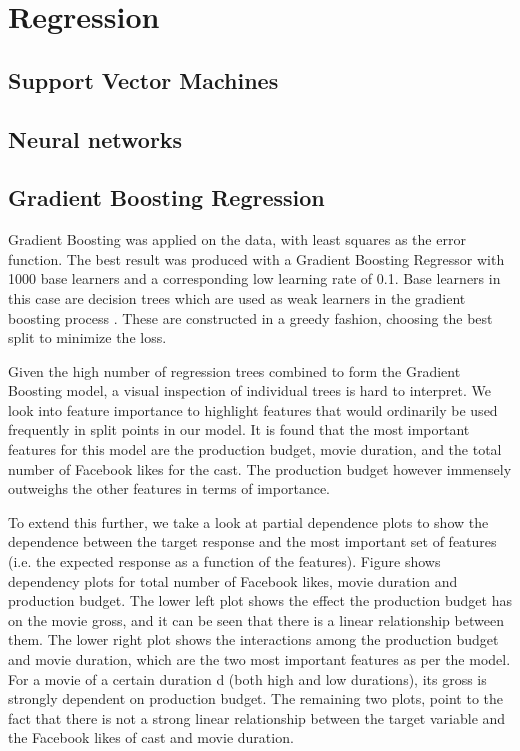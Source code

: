 \section{Regression}
\subsection{Support Vector Machines}
\subsection{Neural networks}
\subsection{Gradient Boosting Regression}
Gradient Boosting was applied on the data, with least squares as the error function. The best result was produced with a Gradient Boosting Regressor with 1000 base learners and a corresponding low learning rate of 0.1. Base learners in this case are decision trees which are used as weak learners in the gradient boosting process \cite{natekin2013gradient}. These are constructed in a greedy fashion, choosing the best split to minimize the loss. 

Given the high number of regression trees combined to form the Gradient Boosting model, a visual inspection of individual trees is hard to interpret. We look into feature importance to highlight features that would ordinarily be used frequently in split points in our model. It is found that the most important features for this model are the production budget,  movie duration, and the total number of Facebook likes for the cast. The production budget however immensely outweighs the other features in terms of importance. 

To extend this further, we take a look at partial dependence plots to show the dependence between the target response and the most important set of features (i.e. the expected response as a function of the features). Figure shows dependency plots for total number of Facebook likes, movie duration and production budget. The lower left plot shows the effect the production budget has on the movie gross, and it can be seen that there is a linear relationship between them. The lower right plot shows the interactions among the production budget and movie duration, which are the two most important features as per the model. For a movie of a certain duration d (both high and low durations), its gross is strongly dependent on production budget.  The remaining two plots, point to the fact that there is not a strong linear relationship between the target variable and the Facebook likes of cast and movie duration.

